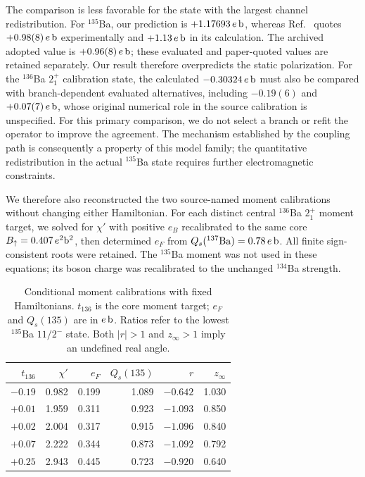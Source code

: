 The comparison is less favorable for the state with the largest channel
redistribution. For $^{135}$Ba, our prediction is
$+1.17693\,e\,{\rm b}$, whereas Ref.~\cite{Nomura2017} quotes
$+0.98(8)\,e\,{\rm b}$ experimentally and $+1.13\,e\,{\rm b}$ in its
calculation. The archived adopted value is $+0.96(8)\,e\,{\rm b}$;
these evaluated and paper-quoted values are retained separately.
Our result therefore overpredicts the static polarization.
For the $^{136}$Ba $2_1^+$ calibration state, the calculated
$-0.30324\,e\,{\rm b}$ must also be compared with branch-dependent
evaluated alternatives, including $-0.19(6)$ and $+0.07(7)\,e\,{\rm b}$,
whose original numerical role in the source calibration is unspecified.
For this primary comparison, we do not select a branch or refit the operator
to improve the agreement.
The mechanism established by the coupling path is consequently a property
of this model family; the quantitative redistribution in the actual
$^{135}$Ba state requires further electromagnetic constraints.

We therefore also reconstructed the two source-named moment calibrations
without changing either Hamiltonian. For each distinct central
$^{136}$Ba $2_1^+$ moment target, we solved for $\chi'$ with positive $e_B$
recalibrated to the same core $B_\uparrow=0.407\,e^2{\rm b}^2$,
then determined $e_F$ from $Q_s(^{137}{\rm Ba})=0.78\,e\,{\rm b}$.
All finite sign-consistent roots were retained. The $^{135}$Ba moment
was not used in these equations; its boson charge was recalibrated to
the unchanged $^{134}$Ba strength.

\begin{table}[t]
\caption{Conditional moment calibrations with fixed Hamiltonians.
$t_{136}$ is the core moment target; $e_F$ and $Q_s(135)$ are in
$e\,{\rm b}$. Ratios refer to the lowest $^{135}$Ba $11/2^-$ state.
Both $|r|>1$ and $z_\infty>1$ imply an undefined real angle.}\label{tab:calibrated}
\centering
\setlength{\tabcolsep}{3pt}
\begin{tabular}{rrrrrr}
\toprule
$t_{136}$ & $\chi'$ & $e_F$ & $Q_s(135)$ & $r$ & $z_\infty$\\
\midrule
$-0.19$ & 0.982 & 0.199 & 1.089 & $-0.642$ & 1.030\\
$+0.01$ & 1.959 & 0.311 & 0.923 & $-1.093$ & 0.850\\
$+0.02$ & 2.004 & 0.317 & 0.915 & $-1.096$ & 0.840\\
$+0.07$ & 2.222 & 0.344 & 0.873 & $-1.092$ & 0.792\\
$+0.25$ & 2.943 & 0.445 & 0.723 & $-0.920$ & 0.640\\
\bottomrule
\end{tabular}
\end{table}

